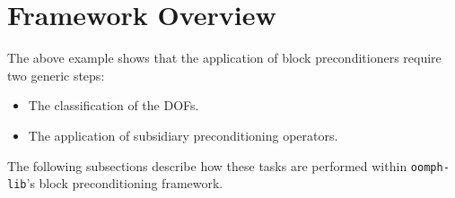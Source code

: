 \section{ Framework Overview\label{sec:framework_overview}}
The above example shows that the application of block preconditioners require
two generic steps:
\begin{itemize}
\item The classification of the DOFs.
\item The application of subsidiary preconditioning operators.
\end{itemize}
The following subsections describe how these tasks are performed within
\texttt{oomph-lib}'s block preconditioning framework.

